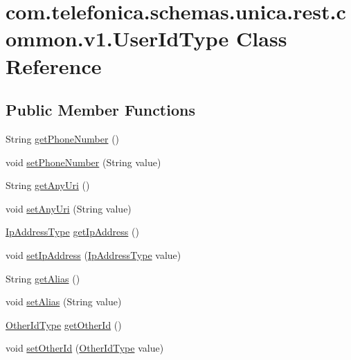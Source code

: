 \hypertarget{classcom_1_1telefonica_1_1schemas_1_1unica_1_1rest_1_1common_1_1v1_1_1UserIdType}{
\section{com.telefonica.schemas.unica.rest.common.v1.UserIdType Class Reference}
\label{classcom_1_1telefonica_1_1schemas_1_1unica_1_1rest_1_1common_1_1v1_1_1UserIdType}
}
\subsection*{Public Member Functions}
\begin{DoxyCompactItemize}
\item 
String \hyperlink{classcom_1_1telefonica_1_1schemas_1_1unica_1_1rest_1_1common_1_1v1_1_1UserIdType_a474f4c5c4e2c6ab1c11c51955b4eb542}{getPhoneNumber} ()
\item 
void \hyperlink{classcom_1_1telefonica_1_1schemas_1_1unica_1_1rest_1_1common_1_1v1_1_1UserIdType_a973f8b236336c93b0ba89380793f3223}{setPhoneNumber} (String value)
\item 
String \hyperlink{classcom_1_1telefonica_1_1schemas_1_1unica_1_1rest_1_1common_1_1v1_1_1UserIdType_adefd1b4bb4e6a9eea4f4fe1c255c743d}{getAnyUri} ()
\item 
void \hyperlink{classcom_1_1telefonica_1_1schemas_1_1unica_1_1rest_1_1common_1_1v1_1_1UserIdType_aa2914c7ba1e2b0f8d1bb97e04094f98a}{setAnyUri} (String value)
\item 
\hyperlink{classcom_1_1telefonica_1_1schemas_1_1unica_1_1rest_1_1common_1_1v1_1_1IpAddressType}{IpAddressType} \hyperlink{classcom_1_1telefonica_1_1schemas_1_1unica_1_1rest_1_1common_1_1v1_1_1UserIdType_abdecc3cce12c230e64d5f4f609a6c552}{getIpAddress} ()
\item 
void \hyperlink{classcom_1_1telefonica_1_1schemas_1_1unica_1_1rest_1_1common_1_1v1_1_1UserIdType_a2dd1165b531385f3b00a257088e14aab}{setIpAddress} (\hyperlink{classcom_1_1telefonica_1_1schemas_1_1unica_1_1rest_1_1common_1_1v1_1_1IpAddressType}{IpAddressType} value)
\item 
String \hyperlink{classcom_1_1telefonica_1_1schemas_1_1unica_1_1rest_1_1common_1_1v1_1_1UserIdType_ad7eb09c833498f45e37d0a3b60f7d35d}{getAlias} ()
\item 
void \hyperlink{classcom_1_1telefonica_1_1schemas_1_1unica_1_1rest_1_1common_1_1v1_1_1UserIdType_aef001949a81cf27febe1ba126ccb8d3d}{setAlias} (String value)
\item 
\hyperlink{classcom_1_1telefonica_1_1schemas_1_1unica_1_1rest_1_1common_1_1v1_1_1OtherIdType}{OtherIdType} \hyperlink{classcom_1_1telefonica_1_1schemas_1_1unica_1_1rest_1_1common_1_1v1_1_1UserIdType_ab5632a022a6886026c6eb51c5d5039d0}{getOtherId} ()
\item 
void \hyperlink{classcom_1_1telefonica_1_1schemas_1_1unica_1_1rest_1_1common_1_1v1_1_1UserIdType_ac537b5912101d01dd7881569b2f23e9d}{setOtherId} (\hyperlink{classcom_1_1telefonica_1_1schemas_1_1unica_1_1rest_1_1common_1_1v1_1_1OtherIdType}{OtherIdType} value)
\end{DoxyCompactItemize}
